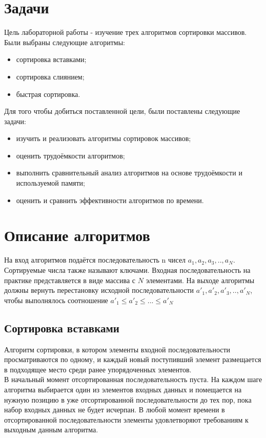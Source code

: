 \documentclass[12pt, a4paper]{report}
\begin{document}
	\section{Задачи}
	Цель лабораторной работы - изучение трех алгоритмов сортировки массивов. Были выбраны следующие алгоритмы:
	\begin{itemize}
		\item сортировка вставками;
		\item сортировка слиянием;
		\item быстрая сортировка.
	\end{itemize}
	Для того чтобы добиться поставленной цели, были поставлены следующие задачи:
	\begin{itemize}
		\item изучить и реализовать алгоритмы сортировок массивов;
		\item оценить трудоёмкости алгоритмов;
		\item выполнить сравнительный анализ алгоритмов на основе трудоёмкости и используемой памяти;
		\item оценить и сравнить эффективности алгоритмов по времени.
	\end{itemize}

	\section{Описание алгоритмов}
	На вход алгоритмов подаётся последовательность n чисел $a_1, a_2, a_3,.., a_N$. Сортируемые числа также называют ключами. Входная последовательность на практике представляется в виде массива с $N$	элементами. На выходе алгоритмы должны вернуть перестановку исходной последовательности $a'_1, a'_2, a'_3,.., a'_N$, чтобы выполнялось соотношение $a'_1 \leq a'_2 \leq ...\leq a'_N$\\
	
	\subsection{Сортировка вставками}
	Алгоритм сортировки, в котором элементы входной последовательности просматриваются по одному, и каждый новый поступивший элемент размещается в подходящее место среди ранее упорядоченных элементов.\\
	В начальный момент отсортированная последовательность пуста. На каждом шаге алгоритма выбирается один из элементов входных данных и помещается на нужную позицию в уже отсортированной последовательности до тех пор, пока набор входных данных не будет исчерпан. В любой момент времени в отсортированной последовательности элементы удовлетворяют требованиям к выходным данным алгоритма.
\end{document}
